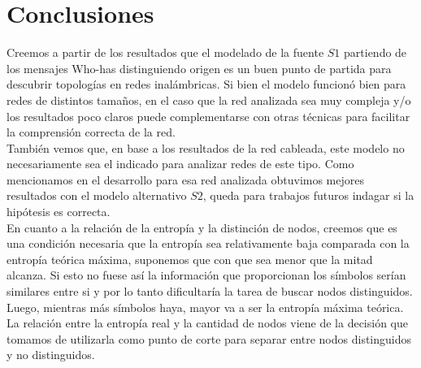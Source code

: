 \section{Conclusiones}

Creemos a partir de los resultados que el modelado de la fuente $S1$ partiendo de los mensajes Who-has distinguiendo origen es un buen punto de partida para descubrir topologías en redes inalámbricas. Si bien el modelo funcionó bien para redes de distintos tamaños, en el caso que la red analizada sea muy compleja y/o los resultados poco claros puede complementarse con otras técnicas para facilitar la comprensión correcta de la red.\\

También vemos que, en base a los resultados de la red cableada, este modelo no necesariamente sea el indicado para analizar redes de este tipo. Como mencionamos en el desarrollo para esa red analizada obtuvimos mejores resultados con el modelo alternativo $S2$, queda para trabajos futuros indagar si la hipótesis es correcta.\\

En cuanto a la relación de la entropía y la distinción de nodos, creemos que es una condición necesaria que la entropía sea relativamente baja comparada con la entropía teórica máxima, suponemos que con que sea menor que la mitad alcanza. Si esto no fuese así la información que proporcionan los símbolos serían similares entre si y por lo tanto dificultaría la tarea de buscar nodos distinguidos.\\

Luego, mientras más símbolos haya, mayor va a ser la entropía máxima teórica. La relación entre la entropía real y la cantidad de nodos viene de la decisión que tomamos de utilizarla como punto de corte para separar entre nodos distinguidos y no distinguidos.

\addtolength{\textheight}{-12cm}   %




